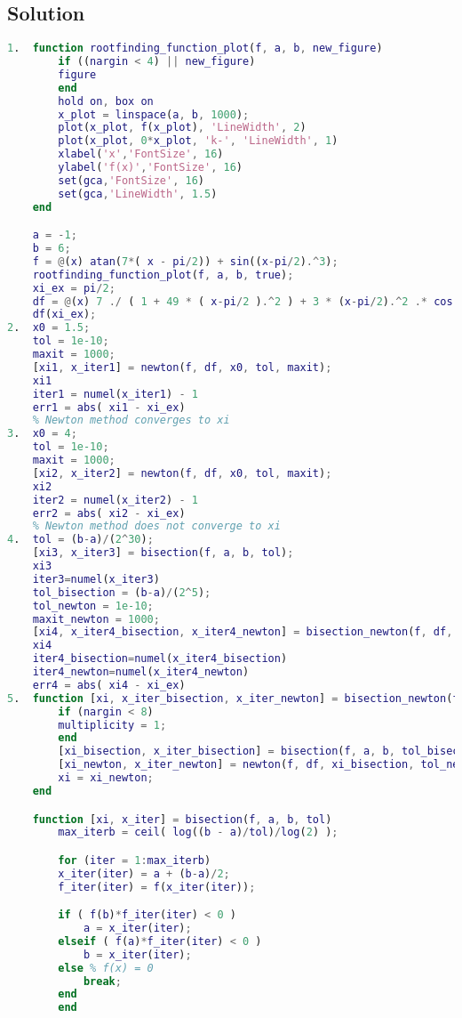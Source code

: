 \documentclass[12pt, a4paper]{report}
\newtheorem[style=M,bodystyle=\normalfont]{theorem}{Theorem}
\newtheorem[style=M,bodystyle=\normalfont]{corollary}{Corollary}
\newtheorem[style=M,bodystyle=\normalfont]{lemma}{Lemma}
\newtheorem[style=M,bodystyle=\normalfont]{definition}{Definition}
\begin{document}
    \subsection*{Solution}
        \begin{lstlisting}[language=Matlab]
1.  function rootfinding_function_plot(f, a, b, new_figure)
        if ((nargin < 4) || new_figure)
        figure
        end
        hold on, box on
        x_plot = linspace(a, b, 1000);
        plot(x_plot, f(x_plot), 'LineWidth', 2)
        plot(x_plot, 0*x_plot, 'k-', 'LineWidth', 1)
        xlabel('x','FontSize', 16)
        ylabel('f(x)','FontSize', 16)
        set(gca,'FontSize', 16)
        set(gca,'LineWidth', 1.5)
    end

    a = -1;
    b = 6;
    f = @(x) atan(7*( x - pi/2)) + sin((x-pi/2).^3);
    rootfinding_function_plot(f, a, b, true);
    xi_ex = pi/2;
    df = @(x) 7 ./ ( 1 + 49 * ( x-pi/2 ).^2 ) + 3 * (x-pi/2).^2 .* cos( (x-pi/2).^3 );
    df(xi_ex); 
2.  x0 = 1.5;
    tol = 1e-10;
    maxit = 1000;
    [xi1, x_iter1] = newton(f, df, x0, tol, maxit);
    xi1
    iter1 = numel(x_iter1) - 1
    err1 = abs( xi1 - xi_ex)
    % Newton method converges to xi
3.  x0 = 4;
    tol = 1e-10;
    maxit = 1000;
    [xi2, x_iter2] = newton(f, df, x0, tol, maxit);
    xi2
    iter2 = numel(x_iter2) - 1
    err2 = abs( xi2 - xi_ex)
    % Newton method does not converge to xi
4.  tol = (b-a)/(2^30);
    [xi3, x_iter3] = bisection(f, a, b, tol);
    xi3
    iter3=numel(x_iter3)  
    tol_bisection = (b-a)/(2^5);
    tol_newton = 1e-10;
    maxit_newton = 1000;
    [xi4, x_iter4_bisection, x_iter4_newton] = bisection_newton(f, df, a, b, tol_bisection, tol_newton, maxit_newton);
    xi4
    iter4_bisection=numel(x_iter4_bisection)
    iter4_newton=numel(x_iter4_newton)
    err4 = abs( xi4 - xi_ex)
5.  function [xi, x_iter_bisection, x_iter_newton] = bisection_newton(f, df, a, b, tol_bisection, tol_newton, maxit_newton, multiplicity)
        if (nargin < 8)
        multiplicity = 1;
        end
        [xi_bisection, x_iter_bisection] = bisection(f, a, b, tol_bisection);
        [xi_newton, x_iter_newton] = newton(f, df, xi_bisection, tol_newton, maxit_newton, multiplicity);
        xi = xi_newton;
    end

    function [xi, x_iter] = bisection(f, a, b, tol)
        max_iterb = ceil( log((b - a)/tol)/log(2) );

        for (iter = 1:max_iterb)
        x_iter(iter) = a + (b-a)/2;
        f_iter(iter) = f(x_iter(iter));

        if ( f(b)*f_iter(iter) < 0 )
            a = x_iter(iter);
        elseif ( f(a)*f_iter(iter) < 0 )
            b = x_iter(iter);
        else % f(x) = 0
            break;
        end
        end


\end{lstlisting}
\end{document}
